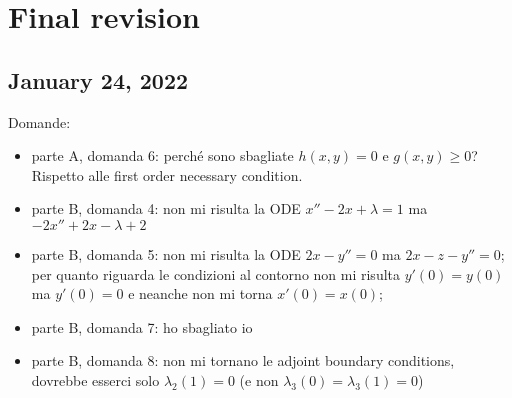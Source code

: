 \chapter{Final revision}
\section{January 24, 2022}
	Domande:
	\begin{itemize}
		\item parte A, domanda 6: perché sono sbagliate $h(x,y) = 0$ e $g(x,y)\geq 0$? Rispetto alle first order necessary condition.
		
		\item parte B, domanda 4: non mi risulta la ODE $x''-2x+\lambda = 1$ ma$-2x'' +2x - \lambda + 2$
		
		\item parte B, domanda 5: non mi risulta la ODE $2x-y''=0$ ma $2x-z-y''=0$; per quanto riguarda le condizioni al contorno non mi risulta $y'(0) = y(0)$ ma $y'(0) = 0$ e neanche non mi torna $x'(0) = x(0)$;
		
		\item parte B, domanda 7: ho sbagliato io
		
		\item parte B, domanda 8: non mi tornano le adjoint boundary conditions, dovrebbe esserci solo $\lambda_2(1) = 0$ (e non $\lambda_3(0) = \lambda_3(1) = 0$)
	\end{itemize}

